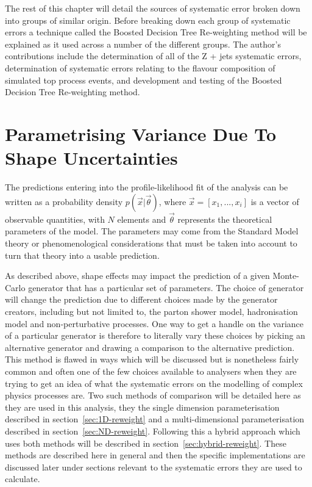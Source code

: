 The rest of this chapter will detail the sources of systematic error broken down
into groups of similar origin. Before breaking down each group of systematic
errors a technique called the Boosted Decision Tree Re-weighting method will be
explained as it used across a number of the different groups. The author's
contributions include the determination of all of the Z + jets systematic
errors, determination of systematic errors relating to the flavour composition
of simulated top process events, and development and testing of the Boosted
Decision Tree Re-weighting method.

\section{Parametrising Variance Due To Shape Uncertainties}
\label{sec:re-weighting}

The predictions entering into the profile-likelihood fit of the analysis can be
written as a probability density $p(\vec{x}|\vec{\theta})$, where $\vec{x} =
[x_{1},..., x_{i}]$ is a vector of observable quantities, with $N$ elements and
$\vec{\theta}$ represents the theoretical parameters of the model. The
parameters may come from the Standard Model theory or phenomenological
considerations that must be taken into account to turn that theory into a usable
prediction.

As described above, shape effects may impact the prediction of a given
Monte-Carlo generator that has a particular set of parameters. The choice of
generator will change the prediction due to different choices made by the
generator creators, including but not limited to, the parton shower model,
hadronisation model and non-perturbative processes. One way to get a handle on
the variance of a particular generator is therefore to literally vary these
choices by picking an alternative generator and drawing a comparison to the
alternative prediction. This method is flawed in ways which will be discussed
but is nonetheless fairly common and often one of the few choices available to
analysers when they are trying to get an idea of what the systematic errors on
the modelling of complex physics processes are. Two such methods of comparison
will be detailed here as they are used in this analysis, they the single
dimension parameterisation described in section~\ref{sec:1D-reweight} and a
multi-dimensional parameterisation described in section~\ref{sec:ND-reweight}.
Following this a hybrid approach which uses both methods will be described in
section~\ref{sec:hybrid-reweight}. These methods are described here in general
and then the specific implementations are discussed later under sections
relevant to the systematic errors they are used to calculate.

